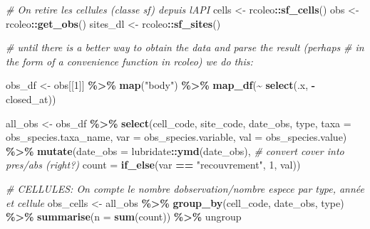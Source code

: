 \documentclass[
]{book}
\newenvironment{Shaded}{\begin{snugshade}}{\end{snugshade}}
\newcommand{\CommentTok}[1]{\textcolor[rgb]{0.56,0.35,0.01}{\textit{#1}}}
\newcommand{\DataTypeTok}[1]{\textcolor[rgb]{0.13,0.29,0.53}{#1}}
\newcommand{\DecValTok}[1]{\textcolor[rgb]{0.00,0.00,0.81}{#1}}
\newcommand{\KeywordTok}[1]{\textcolor[rgb]{0.13,0.29,0.53}{\textbf{#1}}}
\newcommand{\NormalTok}[1]{#1}
\newcommand{\OperatorTok}[1]{\textcolor[rgb]{0.81,0.36,0.00}{\textbf{#1}}}
\newcommand{\StringTok}[1]{\textcolor[rgb]{0.31,0.60,0.02}{#1}}
\begin{document}
\begin{Shaded}
\begin{Highlighting}[]
\CommentTok{\# On retire les cellules (classe sf) depuis l\textquotesingle{}API}
\NormalTok{cells \textless{}{-}}\StringTok{ }\NormalTok{rcoleo}\OperatorTok{::}\KeywordTok{sf\_cells}\NormalTok{()}
\NormalTok{obs \textless{}{-}}\StringTok{ }\NormalTok{rcoleo}\OperatorTok{::}\KeywordTok{get\_obs}\NormalTok{()}
\NormalTok{sites\_dl \textless{}{-}}\StringTok{ }\NormalTok{rcoleo}\OperatorTok{::}\KeywordTok{sf\_sites}\NormalTok{()}

\CommentTok{\# until there is a better way to obtain the data and parse the result (perhaps}
\CommentTok{\# in the form of a convenience function in rcoleo) we do this:}

\NormalTok{obs\_df \textless{}{-}}\StringTok{ }\NormalTok{obs[[}\DecValTok{1}\NormalTok{]] }\OperatorTok{\%\textgreater{}\%}\StringTok{ }\KeywordTok{map}\NormalTok{(}\StringTok{"body"}\NormalTok{) }\OperatorTok{\%\textgreater{}\%}\StringTok{ }\KeywordTok{map\_df}\NormalTok{(}\OperatorTok{\textasciitilde{}}\StringTok{ }\KeywordTok{select}\NormalTok{(.x, }\OperatorTok{{-}}\NormalTok{closed\_at))}

\NormalTok{all\_obs \textless{}{-}}\StringTok{ }\NormalTok{obs\_df }\OperatorTok{\%\textgreater{}\%}
\StringTok{  }\KeywordTok{select}\NormalTok{(cell\_code, site\_code, date\_obs, type, }
         \DataTypeTok{taxa =}\NormalTok{ obs\_species.taxa\_name, }
         \DataTypeTok{var =}\NormalTok{ obs\_species.variable, }
         \DataTypeTok{val =}\NormalTok{ obs\_species.value) }\OperatorTok{\%\textgreater{}\%}\StringTok{ }
\StringTok{  }\KeywordTok{mutate}\NormalTok{(}\DataTypeTok{date\_obs =}\NormalTok{ lubridate}\OperatorTok{::}\KeywordTok{ymd}\NormalTok{(date\_obs),}
         \CommentTok{\# convert cover into pres/abs (right?)}
         \DataTypeTok{count =} \KeywordTok{if\_else}\NormalTok{(var }\OperatorTok{==}\StringTok{ "recouvrement"}\NormalTok{, }\DecValTok{1}\NormalTok{, val))}

\CommentTok{\# CELLULES: On compte le nombre d\textquotesingle{}observation/nombre espece par type, année et cellule}
\NormalTok{obs\_cells \textless{}{-}}\StringTok{ }\NormalTok{all\_obs }\OperatorTok{\%\textgreater{}\%}\StringTok{ }
\StringTok{  }\KeywordTok{group\_by}\NormalTok{(cell\_code, date\_obs, type) }\OperatorTok{\%\textgreater{}\%}\StringTok{ }
\StringTok{  }\KeywordTok{summarise}\NormalTok{(}\DataTypeTok{n =} \KeywordTok{sum}\NormalTok{(count)) }\OperatorTok{\%\textgreater{}\%}\StringTok{ }
\StringTok{  }\NormalTok{ungroup}


\end{Highlighting}
\end{Shaded}
\end{document}
